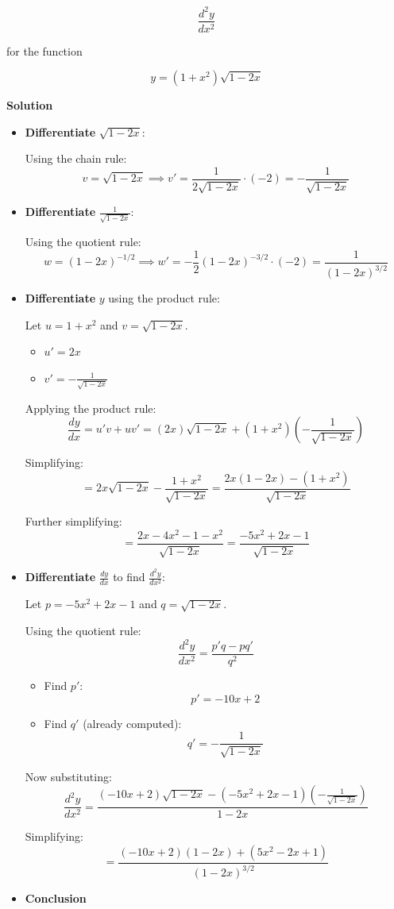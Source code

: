 \documentclass[
]{book}
\providecommand{\tightlist}{%
  \setlength{\itemsep}{0pt}\setlength{\parskip}{0pt}}
\theoremstyle{definition}
\theoremstyle{definition}
\theoremstyle{definition}
\theoremstyle{definition}
\theoremstyle{remark}
\begin{document}
\[
\frac{d^2y}{dx^2}
\]

for the function

\[
y = (1 + x^2)\sqrt{1 - 2x}
\]

\textbf{Solution}

\begin{itemize}
\item
  \textbf{Differentiate} \(\sqrt{1 - 2x}\):

  Using the chain rule: \[
  v = \sqrt{1 - 2x} \implies v' = \frac{1}{2\sqrt{1 - 2x}} \cdot (-2) = -\frac{1}{\sqrt{1 - 2x}}
  \]
\item
  \textbf{Differentiate} \(\frac{1}{\sqrt{1 - 2x}}\):

  Using the quotient rule: \[
  w = (1 - 2x)^{-1/2} \implies w' = -\frac{1}{2}(1 - 2x)^{-3/2} \cdot (-2) = \frac{1}{(1 - 2x)^{3/2}}
  \]
\item
  \textbf{Differentiate} \(y\) using the product rule:

  Let \(u = 1 + x^2\) and \(v = \sqrt{1 - 2x}\).

  \begin{itemize}
  \tightlist
  \item
    \(u' = 2x\)
  \item
    \(v' = -\frac{1}{\sqrt{1 - 2x}}\)
  \end{itemize}

  Applying the product rule: \[
  \frac{dy}{dx} = u'v + uv' = (2x)\sqrt{1 - 2x} + (1 + x^2)\left(-\frac{1}{\sqrt{1 - 2x}}\right)
  \]

  Simplifying: \[
  = 2x\sqrt{1 - 2x} - \frac{1 + x^2}{\sqrt{1 - 2x}} = \frac{2x(1 - 2x) - (1 + x^2)}{\sqrt{1 - 2x}}
  \]

  Further simplifying: \[
  = \frac{2x - 4x^2 - 1 - x^2}{\sqrt{1 - 2x}} = \frac{-5x^2 + 2x - 1}{\sqrt{1 - 2x}}
  \]
\item
  \textbf{Differentiate} \(\frac{dy}{dx}\) to find \(\frac{d^2y}{dx^2}\):

  Let \(p = -5x^2 + 2x - 1\) and \(q = \sqrt{1 - 2x}\).

  Using the quotient rule: \[
  \frac{d^2y}{dx^2} = \frac{p'q - pq'}{q^2}
  \]

  \begin{itemize}
  \item
    Find \(p'\): \[
    p' = -10x + 2
    \]
  \item
    Find \(q'\) (already computed): \[
    q' = -\frac{1}{\sqrt{1 - 2x}}
    \]
  \end{itemize}

  Now substituting: \[
  \frac{d^2y}{dx^2} = \frac{(-10x + 2)\sqrt{1 - 2x} - (-5x^2 + 2x - 1)\left(-\frac{1}{\sqrt{1 - 2x}}\right)}{1 - 2x}
  \]

  Simplifying: \[
  = \frac{(-10x + 2)(1 - 2x) + (5x^2 - 2x + 1)}{(1 - 2x)^{3/2}}
  \]
\item
  \textbf{Conclusion}
\end{itemize}
\end{document}
